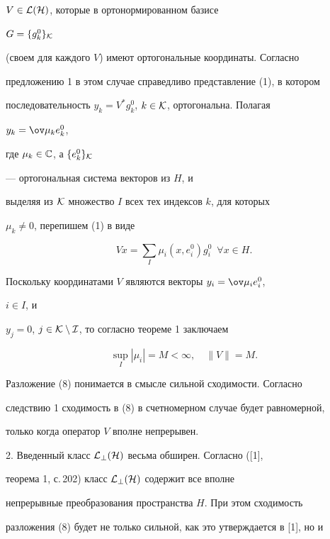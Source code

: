 $V\in\cal L(H)$, которые в ортонормированном базисе 


$G=\{g^0_k\}_{\cal K}$ 


(своем для каждого $V$) имеют ортогональные координаты. Согласно 


предложению 1 в этом случае справедливо представление (1), в котором 


последовательность $y_k=V^*g^0_k$, $k\in\cal K$, ортогональна. Полагая 


$y_k=\ov\mu_k e^0_k$, 


где $\mu_k\in\Bbb C$, а $\{e^0_k\}_{\cal K}$ 


--- ортогональная система векторов из $H$, и 


выделяя из $\cal K$ множество $I$ всех тех индексов $k$, для которых 


$\mu_k\ne0$, перепишем (1) в виде 


\begin{equation} 


V x=\sum_I\mu_i(x,e^0_i)g^0_i\ \; \forall x\in H. 


\end{equation} 


Поскольку координатами $V$ являются векторы $y_i=\ov\mu_i e^0_i$, 


$i\in I$, и 


$y_j=0$, $j\in\cal K\setminus I$, то согласно теореме 1 заключаем


\begin{equation} 


\sup_I|\mu_i|=M<\infty,\quad \|V\|=M. 


\end{equation} 


Разложение (8) понимается в смысле сильной сходимости. Согласно 


следствию 1 сходимость в (8) в счетномерном случае будет равномерной, 


только когда оператор $V$ вполне непрерывен. 


\smallskip 


 


2. Введенный класс $\cal L_\bot(H)$ весьма обширен. Согласно ([1], 


теорема 1, с.\,202) класс $\cal L_\bot (H)$ содержит все вполне 


непрерывные преобразования пространства $H$. При этом сходимость 


разложения (8) будет не только сильной, как это утверждается в [1], но и 


